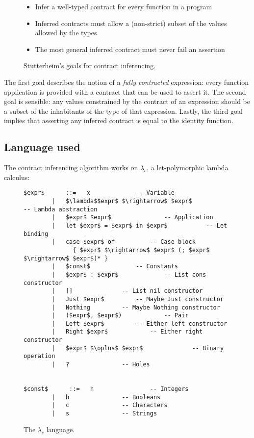 \documentclass[10pt]{report}
\begin{document}
\begin{figure}[htps]
\begin{framed}
\begin{center}
\begin{itemize}
	\item Infer a well-typed contract for every function in a program
	\item Inferred contracts must allow a (non-strict) subset of the values allowed
by the types
	\item The most general inferred contract must never fail an assertion
\end{itemize}
\end{center}
\end{framed}
\caption{\label{fig:goals-stutterheim-contract-inferencing}Stutterheim's goals for contract inferencing.}
\end{figure}

The first goal describes the notion of a \textit{fully contracted} expression: every function application is provided with a contract that can be used to assert it.
The second goal is sensible: any values constrained by the contract of an expression should be a subset of the inhabitants of the type of that expression.
Lastly, the third goal implies that asserting any inferred contract is equal to the identity function.

\subsection{Language used}

The contract inferencing algorithm works on $\lambda_c$, a let-polymorphic lambda calculus:

\begin{figure}[htps]
\begin{lstlisting}[mathescape]
$expr$      ::=   x				-- Variable
        |   $\lambda$$expr$ $\rightarrow$ $expr$				-- Lambda abstraction
        |   $expr$ $expr$				-- Application
        |   let $expr$ = $expr$ in $expr$			-- Let binding
        |   case $expr$ of			-- Case block
              { $expr$ $\rightarrow$ $expr$ (; $expr$ $\rightarrow$ $expr$)* }
        |   $const$				-- Constants
        |   $expr$ : $expr$				-- List cons constructor
        |   []				-- List nil constructor
        |   Just $expr$			-- Maybe Just constructor
        |   Nothing			-- Maybe Nothing constructor
        |   ($expr$, $expr$)			-- Pair
        |   Left $expr$			-- Either left constructor
        |   Right $expr$			-- Either right constructor
        |   $expr$ $\oplus$ $expr$				-- Binary operation
        |   ?				-- Holes


$const$      ::=   n				-- Integers
        |   b				-- Booleans
        |   c				-- Characters
        |   s				-- Strings
\end{lstlisting}
\caption{The $\lambda_c$ language.}
\end{figure}
\end{document}
